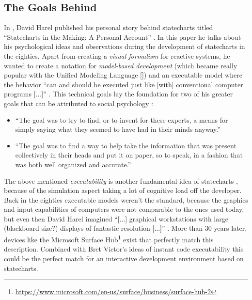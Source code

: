 \subsection{The Goals Behind}
\label{sub:goals-behind-statecharts}
In \citeyear{harel_statecharts_2007}, David Harel published his personal story behind statecharts titled ``Statecharts in the Making: A Personal Account'' \autocite{harel_statecharts_2007}.
In this paper he talks about his psychological ideas and observations during the development of statecharts in the eighties.
Apart from creating a \emph{visual formalism} for reactive systems, he wanted to create a notation for \emph{model-based development} (which became really popular with the Unified Modeling Language [\textcite{cook_unified_2017}]) and an executable model where the behavior ``can and should be executed just like [with] conventional computer programs [...]'' \autocite[1]{harel_statecharts_2007}.
This technical goals lay the foundation for two of his greater goals that can be attributed to social psychology \autocite[3--4]{harel_statecharts_2007}:
\begin{itemize}
    \item ``The goal was to try to find, or to invent for these experts, a means for simply saying what they seemed to have had in their minds anyway.''
    \item ``The goal was to find a way to help take the information that was present collectively in their heads and put it on paper, so to speak, in a fashion that was both well organized and accurate.''
\end{itemize}

The above mentioned \emph{executability} is another fundamental idea of statecharts \autocite[7]{harel_modeling_1998}, because of the simulation aspect taking a lot of cognitive load off the developer.
Back in the eighties executable models weren't the standard, because the graphics and input capabilities of computers were not comparable to the ones used today, but even then David Harel imagined ``[...] graphical workstations with large (blackboard size?) displays of fantastic resolution [...]'' \autocite[272]{harel_statecharts:_1987}.
More than 30 years later, devices like the Microsoft Surface Hub\footnote{\url{https://www.microsoft.com/en-us/surface/business/surface-hub-2}} exist that perfectly match this description.
Combined with Bret Victor's ideas of instant code executability \autocite{victor_inventing_2012} this could be the perfect match for an interactive development environment based on statecharts.

